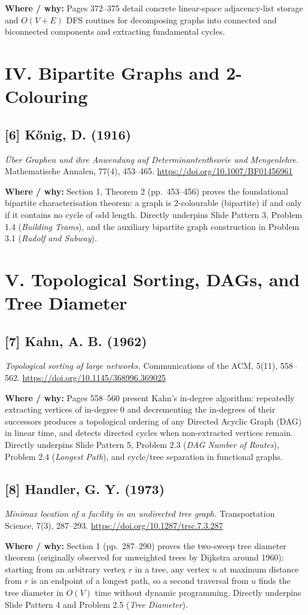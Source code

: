 \documentclass[11pt]{article}
\begin{document}
\textbf{Where / why:}
Pages 372--375 detail concrete linear-space adjacency-list storage and $O(V + E)$ DFS routines for decomposing graphs into connected and biconnected components and extracting fundamental cycles.

\section*{IV. Bipartite Graphs and 2-Colouring}

\subsection*{[6] K\H{o}nig, D. (1916)}
\textit{{\"U}ber Graphen und ihre Anwendung auf Determinantentheorie und Mengenlehre.}
Mathematische Annalen, 77(4), 453--465.
\url{https://doi.org/10.1007/BF01456961}

\textbf{Where / why:}
Section 1, Theorem 2 (pp.~453--456) proves the foundational bipartite characterisation theorem: a graph is 2-colourable (bipartite) if and only if it contains no cycle of odd length. Directly underpins Slide Pattern 3, Problem 1.4 (\emph{Building Teams}), and the auxiliary bipartite graph construction in Problem 3.1 (\emph{Rudolf and Subway}).

\section*{V. Topological Sorting, DAGs, and Tree Diameter}

\subsection*{[7] Kahn, A. B. (1962)}
\textit{Topological sorting of large networks.}
Communications of the ACM, 5(11), 558--562.
\url{https://doi.org/10.1145/368996.369025}

\textbf{Where / why:}
Pages 558--560 present Kahn's in-degree algorithm: repeatedly extracting vertices of in-degree $0$ and decrementing the in-degrees of their successors produces a topological ordering of any Directed Acyclic Graph (DAG) in linear time, and detects directed cycles when non-extracted vertices remain. Directly underpins Slide Pattern 5, Problem 2.3 (\emph{DAG Number of Routes}), Problem 2.4 (\emph{Longest Path}), and cycle/tree separation in functional graphs.

\subsection*{[8] Handler, G. Y. (1973)}
\textit{Minimax location of a facility in an undirected tree graph.}
Transportation Science, 7(3), 287--293.
\url{https://doi.org/10.1287/trsc.7.3.287}

\textbf{Where / why:}
Section 1 (pp.~287--290) proves the two-sweep tree diameter theorem (originally observed for unweighted trees by Dijkstra around 1960): starting from an arbitrary vertex $r$ in a tree, any vertex $u$ at maximum distance from $r$ is an endpoint of a longest path, so a second traversal from $u$ finds the tree diameter in $O(V)$ time without dynamic programming. Directly underpins Slide Pattern 4 and Problem 2.5 (\emph{Tree Diameter}).
\end{document}
